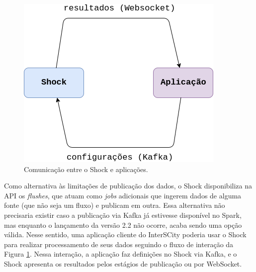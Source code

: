 \begin{figure}[hbt]
  \centering
    \includegraphics[scale=0.5]{figuras/ligacoes.png}
  \caption{Comunicação entre o Shock e aplicações.}
  \label{fig:ligacoes}
\end{figure}

Como alternativa às limitações de publicação dos dados, o Shock
disponibiliza na API os \textit{flushes}, que atuam como \textit{jobs} adicionais
que ingerem dados de alguma fonte (que não seja um fluxo) e publicam
em outra. Essa alternativa não precisaria existir caso a publicação via Kafka
já estivesse disponível no Spark, mas enquanto o lançamento da versão 2.2 não
ocorre, acaba sendo uma opção válida. Nesse sentido, uma aplicação cliente do
InterSCity poderia usar o Shock para realizar processamento de seus dados
seguindo o fluxo de interação da Figura \ref{fig:ligacoes}. Nessa interação, a
aplicação faz definições no Shock via Kafka, e o Shock apresenta os resultados
pelos estágios de publicação ou por WebSocket.
